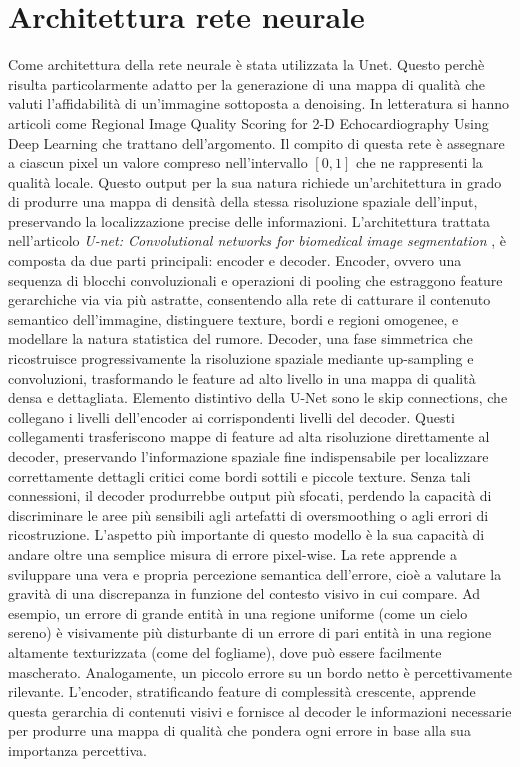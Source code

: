 \section{Architettura rete neurale}
Come architettura della rete neurale è stata utilizzata la Unet. Questo perchè risulta particolarmente adatto per la 
generazione di una mappa di qualità che valuti l'affidabilità di un'immagine sottoposta a denoising. In letteratura si hanno articoli come 
Regional Image Quality Scoring for 2-D Echocardiography Using Deep Learning \cite{Vyver2025} che trattano dell'argomento. Il compito di 
questa rete è assegnare a ciascun pixel un valore compreso nell'intervallo $[0,1]$ che ne rappresenti la 
qualità locale. Questo output per la sua natura richiede un'architettura in grado di produrre una mappa di densità 
della stessa risoluzione spaziale dell'input, preservando la localizzazione precise delle informazioni. 
L'architettura trattata nell'articolo \textit{U-net: Convolutional networks for biomedical image segmentation} \cite{ronneberger2015unetconvolutionalnetworksbiomedical}, è composta da due parti principali: encoder e decoder. 
Encoder, ovvero una sequenza di blocchi convoluzionali e operazioni di pooling che estraggono feature 
gerarchiche via via più astratte, consentendo alla rete di catturare il contenuto semantico dell’immagine, 
distinguere texture, bordi e regioni omogenee, e modellare la natura statistica del rumore.
Decoder, una fase simmetrica che ricostruisce progressivamente la risoluzione spaziale 
mediante up-sampling e convoluzioni, trasformando le feature ad alto livello in una mappa di 
qualità densa e dettagliata.
Elemento distintivo della U-Net sono le skip connections, che collegano i livelli dell’encoder ai corrispondenti 
livelli del decoder. Questi collegamenti trasferiscono mappe di feature ad alta risoluzione direttamente al decoder, 
preservando l’informazione spaziale fine indispensabile per localizzare correttamente dettagli critici come bordi 
sottili e piccole texture. Senza tali connessioni, il decoder produrrebbe output più sfocati, perdendo la capacità 
di discriminare le aree più sensibili agli artefatti di oversmoothing o agli errori di ricostruzione.
L’aspetto più importante di questo modello è la sua capacità di andare oltre una semplice misura di errore pixel-wise. 
La rete apprende a sviluppare una vera e propria percezione semantica dell’errore, cioè a valutare la gravità di una 
discrepanza in funzione del contesto visivo in cui compare. Ad esempio, un errore di grande entità in una regione 
uniforme (come un cielo sereno) è visivamente più disturbante di un errore di pari entità in una regione altamente 
texturizzata (come del fogliame), dove può essere facilmente mascherato. Analogamente, un piccolo errore su un bordo 
netto è percettivamente rilevante. L’encoder, stratificando feature di complessità crescente, apprende questa gerarchia 
di contenuti visivi e fornisce al decoder le informazioni necessarie per produrre una mappa di qualità che pondera 
ogni errore in base alla sua importanza percettiva.

